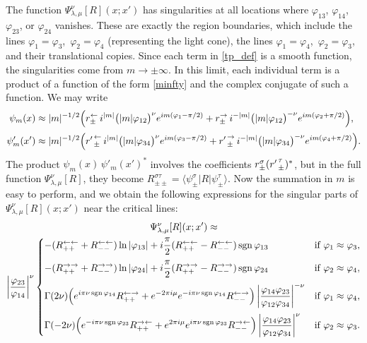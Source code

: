 \documentclass[11pt]{article}
\newcommand*{\bra}[1]{\langle{#1}|}
\newcommand*{\ket}[1]{|{#1}\rangle}
\newcommand{\vp}{\varphi}
\DeclareMathOperator{\sgn}{sgn}
\newcommand{\lar}{{\leftarrow}}
\newcommand{\rar}{{\rightarrow}}
\begin{document}
The function $\Psi^{\nu}_{\lambda,\mu}[R](x;x')$ has singularities at all locations where $\vp_{13}$, $\vp_{14}$, $\vp_{23}$, or $\vp_{24}$ vanishes. These are exactly the region boundaries, which include the lines $\vp_1=\vp_3$,\, $\vp_2=\vp_4$ (representing the light cone), the lines $\vp_1=\vp_4$,\, $\vp_2=\vp_3$, and their translational copies. Since each term in \eqref{tp_def} is a smooth function, the singularities come from $m\to\pm\infty$. In this limit, each individual term is a product of a function of the form \eqref{minfty} and the complex conjugate of such a function. We may write
\begin{equation}\label{psip1}
\begin{aligned}
\psi_m(x)
&\approx |m|^{-1/2}\Bigl(
r^{\lar}_{\pm}\,i^{|m|}
\bigl(|m|\vp_{12}\bigr)^{\nu}e^{im(\vp_1-\pi/2)}
+r^{\rar}_{\pm}\,i^{-|m|}
\bigl(|m|\vp_{12}\bigr)^{-\nu}e^{im(\vp_2+\pi/2)}
\Bigr),\\[2pt]
\psi'_m(x')
&\approx |m|^{-1/2}\Bigl(
{r'\kern1pt}^{\lar}_{\pm}\,i^{|m|}
\bigl(|m|\vp_{34}\bigr)^{\nu}e^{im(\vp_3-\pi/2)}
+{r'\kern1pt}^{\rar}_{\pm}\,i^{-|m|}
\bigl(|m|\vp_{34}\bigr)^{-\nu}e^{im(\vp_4+\pi/2)}
\Bigr).
\end{aligned}
\end{equation}
The product $\psi_m(x)\,\psi'_m(x')^*$ involves the coefficients $r^{\sigma}_{\pm}({r'\kern1pt}^{\tau}_{\pm})^*$, but in the full function $\Psi^{\nu}_{\lambda,\mu}[R]$, they become $R^{\sigma\tau}_{\pm\pm} =\bra{\psi^{\sigma}_{\pm}}R \ket{\psi^{\tau}_{\pm}}$. Now the summation in $m$ is easy to perform, and we obtain the following expressions for the singular parts of $\Psi^{\nu}_{\lambda,\mu}[R](x;x')$ near the critical lines:
\begin{multline}\label{asymp_sing}
\Psi^{\nu}_{\lambda,\mu}[R](x;x')\approx\\
 \left|\frac{\vp_{23}}{\vp_{14}}\right|^{\nu}
\begin{dcases}
-(R^{\lar\lar}_{++}+R^{\lar\lar}_{--})\ln|\vp_{13}|
+i\frac{\pi}{2}(R^{\lar\lar}_{++}-R^{\lar\lar}_{--})\sgn\vp_{13}
&\text{if } \vp_1\approx\vp_3,
\\[2pt]
-(R^{\rar\rar}_{++}+R^{\rar\rar}_{--})\ln|\vp_{24}|
+i\frac{\pi}{2}(R^{\rar\rar}_{++}-R^{\rar\rar}_{--})\sgn\vp_{24}
&\text{if } \vp_2\approx\vp_4,
\\[2pt]
\Gamma(2\nu)\Bigl(e^{i\pi\nu\sgn\vp_{14}}R^{\lar\rar}_{++}
+e^{-2\pi i\mu}e^{-i\pi\nu\sgn\vp_{14}}R^{\lar\rar}_{--}\Bigr)
\left|\frac{\vp_{14}\vp_{23}}{\vp_{12}\vp_{34}}\right|^{-\nu}
&\text{if } \vp_1\approx\vp_4,
\\[2pt]
\Gamma(-2\nu)\Bigl(e^{-i\pi\nu\sgn\vp_{23}}R^{\rar\lar}_{++}
+e^{2\pi i\mu}e^{i\pi\nu\sgn\vp_{23}}R^{\rar\lar}_{--}\Bigr)
\left|\frac{\vp_{14}\vp_{23}}{\vp_{12}\vp_{34}}\right|^{\nu}
&\text{if } \vp_2\approx\vp_3.
\end{dcases}
\end{multline}
\end{document}
